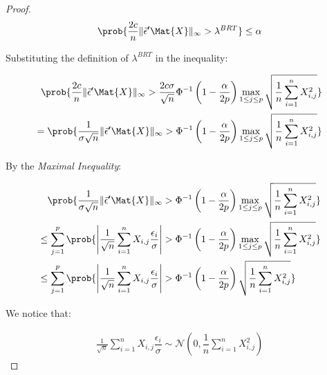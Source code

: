 \begin{proof}
\begin{align*}
\prob{
    \dfrac{2c}{n} \| \Vec{\epsilon}'\Mat{X}\|_{\infty}
    >
    \lambda^{BRT} 
} 
\leq
\alpha
\end{align*}

Substituting the definition of $\lambda^{BRT}$ in the inequality:

\begin{align*}
\prob{
    \dfrac{2c}{n} \| \Vec{\epsilon}'\Mat{X}\|_{\infty}
    >
    {
        \dfrac{2c\sigma}{\sqrt{n}}
        \Phi^{-1}\left(1 - \dfrac{\alpha}{2p}\right)
        \max_{1 \leq j \leq p} \sqrt{
            \dfrac{1}{n} \sum_{i=1}^n X_{i,j}^2
        }
    }
}
\\
= \prob{
    \dfrac{1}{\sigma\sqrt{n}} \| \Vec{\epsilon}'\Mat{X}\|_{\infty}
    >
    {
        \Phi^{-1}\left(1 - \dfrac{\alpha}{2p}\right)
        \max_{1 \leq j \leq p} \sqrt{
            \dfrac{1}{n} \sum_{i=1}^n X_{i,j}^2
        }
    }
}
\end{align*}

By the \emph{Maximal Inequality}:

\begin{align*}
&\quad \prob{
    \dfrac{1}{\sigma\sqrt{n}} \| \Vec{\epsilon}'\Mat{X}\|_{\infty}
    >
    {
        \Phi^{-1}\left(1 - \dfrac{\alpha}{2p}\right)
        \max_{1 \leq j \leq p} \sqrt{
            \dfrac{1}{n} \sum_{i=1}^n X_{i,j}^2
        }
    }
} \\
&\leq \sum_{j=1}^{p} \prob{
    \left| \frac{1}{\sqrt{n}} \sum_{i=1}^{n} X_{i,j} \dfrac{\epsilon_{i}}{\sigma}\right| 
    >
    {
        \Phi^{-1}\left(1 - \dfrac{\alpha}{2p}\right)
        \max_{1 \leq j \leq p} \sqrt{
            \dfrac{1}{n} \sum_{i=1}^n X_{i,j}^2
        }
    }
} \\
&\leq \sum_{j=1}^{p} \prob{
    \left| \frac{1}{\sqrt{n}} \sum_{i=1}^{n} X_{i,j} \dfrac{\epsilon_{i}}{\sigma}\right| 
    >
    {
        \Phi^{-1}\left(1 - \dfrac{\alpha}{2p}\right)
        \sqrt{
            \dfrac{1}{n} \sum_{i=1}^n X_{i,j}^2
        }
    }
} \\
\end{align*}

We notice that:

\begin{align*}
\frac{1}{\sqrt{n}} \sum_{i=1}^{n} X_{i,j} \dfrac{\epsilon_{i}}{\sigma} 
\sim
\mathcal{N} \left(
    0,
    \dfrac{1}{n} \sum_{i=1}^n X_{i,j}^2
\right)
\end{align*}


\end{proof}

